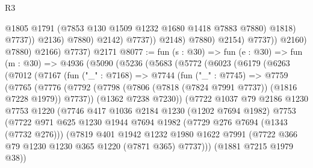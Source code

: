 \begin{lexlean}{R3}
\begin{coremodule}
                                      @1805
                                      @1791
                                      (@7853 @130 @1509 @1232 @1680 @1418 @7883 @7880)
                                      @1818)
                                    @7737))
                                @2136)
                              @7880)
                            @2142)
                          @7737))
                      @2148)
                    @7880)
                  @2154)
                @7737))
            @2160)
          @7880)
        @2166)
      @7737)
    @2171
@8077 := fun (s : @30) =>
  fun (e : @30) =>
  fun (m : @30) =>
  @4936
    (@5090
      (@5236
        (@5683
          (@5772
            (@6023
              (@6179
                (@6263
                  (@7012
                    (@7167
                      (fun ("_" : @7168) =>
                      @7744
                        (fun ("_" : @7745) =>
                        @7759
                          (@7765
                            (@7776
                              (@7792
                                (@7798
                                  (@7806 (@7818 (@7824 @7991 @7737)) (@1816 @7228 @1979))
                                  @7737))
                              (@1362 @7238 @7230))
                            (@7722
                              @1037
                              @79
                              @2186
                              @1230
                              @7753
                              @1220
                              (@7746
                                @417
                                @1036
                                @2184
                                @1230
                                (@1202 @7694 @1982)
                                @7753
                                (@7722
                                  @971
                                  @625
                                  @1230
                                  @1944
                                  @7694
                                  @1982
                                  (@7729 @276 @7694 (@1343 (@7732 @276)))
                                  (@7819
                                    @401
                                    @1942
                                    @1232
                                    @1980
                                    @1622
                                    @7991
                                    (@7722 @366 @79 @1230 @1230 @365 @1220 (@7871 @365) @7737)))
                                (@1881 @7215 @1979 @38))

\end{coremodule}
\end{lexlean}
